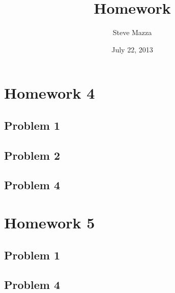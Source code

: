 \documentclass[letterpaper,10pt]{article}
\title{Homework}
\author{Steve Mazza}
\date{July 22, 2013}
\begin{document}
\maketitle

\section*{Homework 4}
\subsection*{Problem 1}

\subsection*{Problem 2}

\subsection*{Problem 4}

\section*{Homework 5}
\subsection*{Problem 1}

\subsection*{Problem 4}
\end{document}
